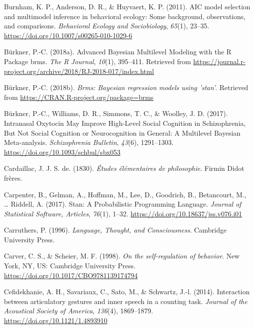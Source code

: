 \documentclass[a4paper,12pt,twoside,onecolumn,openright,final,oldfontcommands]{memoir}
\begin{document}
\leavevmode\hypertarget{ref-burnham_aic_2011}{}%
Burnham, K. P., Anderson, D. R., \& Huyvaert, K. P. (2011). AIC model selection and multimodel inference in behavioral ecology: Some background, observations, and comparisons. \emph{Behavioral Ecology and Sociobiology}, \emph{65}(1), 23--35. \url{https://doi.org/10.1007/s00265-010-1029-6}

\leavevmode\hypertarget{ref-burkner_advanced_2018}{}%
Bürkner, P.-C. (2018a). Advanced Bayesian Multilevel Modeling with the R Package brms. \emph{The R Journal}, \emph{10}(1), 395--411. Retrieved from \url{https://journal.r-project.org/archive/2018/RJ-2018-017/index.html}

\leavevmode\hypertarget{ref-R-brms}{}%
Bürkner, P.-C. (2018b). \emph{Brms: Bayesian regression models using 'stan'}. Retrieved from \url{https://CRAN.R-project.org/package=brms}

\leavevmode\hypertarget{ref-burkner_intranasal_2017}{}%
Bürkner, P.-C., Williams, D. R., Simmons, T. C., \& Woolley, J. D. (2017). Intranasal Oxytocin May Improve High-Level Social Cognition in Schizophrenia, But Not Social Cognition or Neurocognition in General: A Multilevel Bayesian Meta-analysis. \emph{Schizophrenia Bulletin}, \emph{43}(6), 1291--1303. \url{https://doi.org/10.1093/schbul/sbx053}

\leavevmode\hypertarget{ref-cardaillac_etudes_1830}{}%
Cardaillac, J. J. S. de. (1830). \emph{Études élémentaires de philosophie}. Firmin Didot frères.

\leavevmode\hypertarget{ref-carpenter_stan_2017}{}%
Carpenter, B., Gelman, A., Hoffman, M., Lee, D., Goodrich, B., Betancourt, M., \ldots{} Riddell, A. (2017). Stan: A Probabilistic Programming Language. \emph{Journal of Statistical Software, Articles}, \emph{76}(1), 1--32. \url{https://doi.org/10.18637/jss.v076.i01}

\leavevmode\hypertarget{ref-carruthers_language_1996}{}%
Carruthers, P. (1996). \emph{Language, Thought, and Consciousness}. Cambridge University Press.

\leavevmode\hypertarget{ref-carver_self-regulation_1998}{}%
Carver, C. S., \& Scheier, M. F. (1998). \emph{On the self-regulation of behavior}. New York, NY, US: Cambridge University Press. \url{https://doi.org/10.1017/CBO9781139174794}

\leavevmode\hypertarget{ref-cefidekhanie_interaction_2014}{}%
Cefidekhanie, A. H., Savariaux, C., Sato, M., \& Schwartz, J.-l. (2014). Interaction between articulatory gestures and inner speech in a counting task. \emph{Journal of the Acoustical Society of America}, \emph{136}(4), 1869--1879. \url{https://doi.org/10.1121/1.4893910}
\end{document}
